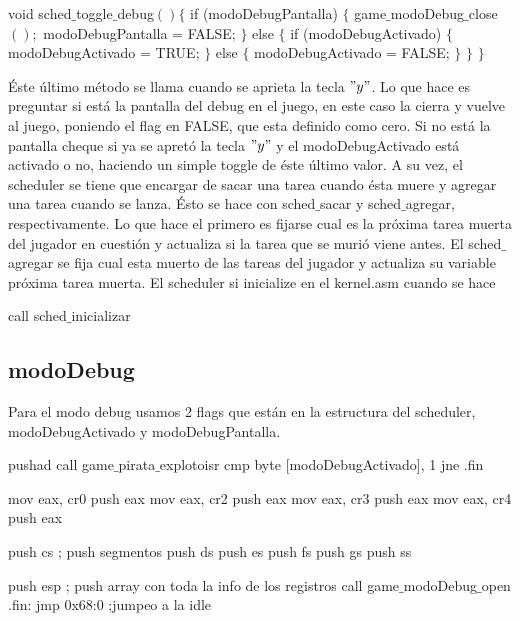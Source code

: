 \begin{algorithmic}
    \State \tab void sched$\_$toggle$\_$debug$() \{$
        \State \tab \tab if (modoDebugPantalla) $\{$
        \State \tab \tab \tab game$\_$modoDebug$\_$close$();$
        \State \tab \tab \tab modoDebugPantalla = FALSE;
        \State \tab \tab $\}$ else $\{$
        \State \tab \tab \tab if (modoDebugActivado) $\{$
        \State \tab \tab \tab \tab modoDebugActivado = TRUE;
        \State \tab \tab \tab $\}$ else $\{$
        \State \tab \tab \tab \tab modoDebugActivado = FALSE;
        \State \tab \tab	\tab $\}$
        \State \tab \tab $\}$
    \State \tab $\}$
\end{algorithmic}

Éste último método se llama cuando se aprieta la tecla $"y"$. Lo que hace es preguntar si está la pantalla del debug en el juego, en este caso la cierra y vuelve al juego, poniendo el flag en FALSE, que esta definido como cero. Si no está la pantalla cheque si ya se apretó la tecla $"y"$ y el modoDebugActivado está activado o no, haciendo un simple toggle de éste último valor.
\newline
A su vez, el scheduler se tiene que encargar de sacar una tarea cuando ésta muere y agregar una tarea cuando se lanza. Ésto se hace con sched$\_$sacar y sched$\_$agregar, respectivamente. Lo que hace el primero es fijarse cual es la próxima tarea muerta del jugador en cuestión y actualiza si la tarea que se murió viene antes. El sched$\_$agregar se fija cual esta muerto de las tareas del jugador y actualiza su variable próxima tarea muerta.
\newline
El scheduler si inicialize en el kernel.asm cuando se hace
\begin{algorithmic}
\State call sched$\_$inicializar
\end{algorithmic}


\subsection{modoDebug}
Para el modo debug usamos 2 flags que están en la estructura del scheduler, modoDebugActivado y modoDebugPantalla.

\begin{algorithmic}
	\State \tab pushad
    \State \tab call game$\_$pirata$\_$explotoisr
    \State \tab cmp byte [modoDebugActivado], 1
    \State \tab jne .fin
    
    \State \tab mov eax, cr0
    \State \tab push eax
    \State \tab mov eax, cr2
    \State \tab push eax
    \State \tab mov eax, cr3
    \State \tab push eax
    \State \tab mov eax, cr4
    \State \tab push eax

    \State \tab push cs ; push segmentos
    \State \tab push ds
    \State \tab push es
    \State \tab push fs
    \State \tab push gs
    \State \tab push ss

    \State \tab push esp ; push array con toda la info de los registros
    \State \tab call game$\_$modoDebug$\_$open
  	\State .fin:
    \State \tab jmp 0x68:0 ;jumpeo a la idle\end{algorithmic}
    
